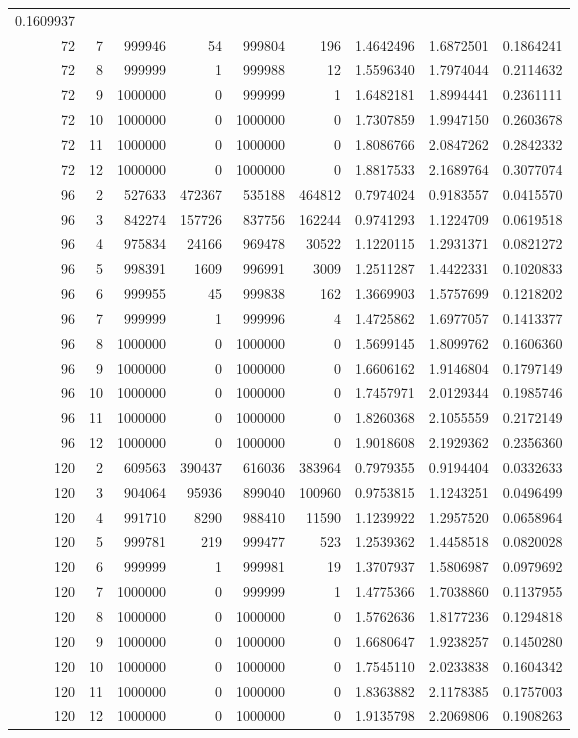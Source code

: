 \documentclass[]{article}
\begin{document}
\begin{longtable}[]{@{}rrrrrrrrr@{}}
0.1609937\tabularnewline
72 & 7 & 999946 & 54 & 999804 & 196 & 1.4642496 & 1.6872501 &
0.1864241\tabularnewline
72 & 8 & 999999 & 1 & 999988 & 12 & 1.5596340 & 1.7974044 &
0.2114632\tabularnewline
72 & 9 & 1000000 & 0 & 999999 & 1 & 1.6482181 & 1.8994441 &
0.2361111\tabularnewline
72 & 10 & 1000000 & 0 & 1000000 & 0 & 1.7307859 & 1.9947150 &
0.2603678\tabularnewline
72 & 11 & 1000000 & 0 & 1000000 & 0 & 1.8086766 & 2.0847262 &
0.2842332\tabularnewline
72 & 12 & 1000000 & 0 & 1000000 & 0 & 1.8817533 & 2.1689764 &
0.3077074\tabularnewline
96 & 2 & 527633 & 472367 & 535188 & 464812 & 0.7974024 & 0.9183557 &
0.0415570\tabularnewline
96 & 3 & 842274 & 157726 & 837756 & 162244 & 0.9741293 & 1.1224709 &
0.0619518\tabularnewline
96 & 4 & 975834 & 24166 & 969478 & 30522 & 1.1220115 & 1.2931371 &
0.0821272\tabularnewline
96 & 5 & 998391 & 1609 & 996991 & 3009 & 1.2511287 & 1.4422331 &
0.1020833\tabularnewline
96 & 6 & 999955 & 45 & 999838 & 162 & 1.3669903 & 1.5757699 &
0.1218202\tabularnewline
96 & 7 & 999999 & 1 & 999996 & 4 & 1.4725862 & 1.6977057 &
0.1413377\tabularnewline
96 & 8 & 1000000 & 0 & 1000000 & 0 & 1.5699145 & 1.8099762 &
0.1606360\tabularnewline
96 & 9 & 1000000 & 0 & 1000000 & 0 & 1.6606162 & 1.9146804 &
0.1797149\tabularnewline
96 & 10 & 1000000 & 0 & 1000000 & 0 & 1.7457971 & 2.0129344 &
0.1985746\tabularnewline
96 & 11 & 1000000 & 0 & 1000000 & 0 & 1.8260368 & 2.1055559 &
0.2172149\tabularnewline
96 & 12 & 1000000 & 0 & 1000000 & 0 & 1.9018608 & 2.1929362 &
0.2356360\tabularnewline
120 & 2 & 609563 & 390437 & 616036 & 383964 & 0.7979355 & 0.9194404 &
0.0332633\tabularnewline
120 & 3 & 904064 & 95936 & 899040 & 100960 & 0.9753815 & 1.1243251 &
0.0496499\tabularnewline
120 & 4 & 991710 & 8290 & 988410 & 11590 & 1.1239922 & 1.2957520 &
0.0658964\tabularnewline
120 & 5 & 999781 & 219 & 999477 & 523 & 1.2539362 & 1.4458518 &
0.0820028\tabularnewline
120 & 6 & 999999 & 1 & 999981 & 19 & 1.3707937 & 1.5806987 &
0.0979692\tabularnewline
120 & 7 & 1000000 & 0 & 999999 & 1 & 1.4775366 & 1.7038860 &
0.1137955\tabularnewline
120 & 8 & 1000000 & 0 & 1000000 & 0 & 1.5762636 & 1.8177236 &
0.1294818\tabularnewline
120 & 9 & 1000000 & 0 & 1000000 & 0 & 1.6680647 & 1.9238257 &
0.1450280\tabularnewline
120 & 10 & 1000000 & 0 & 1000000 & 0 & 1.7545110 & 2.0233838 &
0.1604342\tabularnewline
120 & 11 & 1000000 & 0 & 1000000 & 0 & 1.8363882 & 2.1178385 &
0.1757003\tabularnewline
120 & 12 & 1000000 & 0 & 1000000 & 0 & 1.9135798 & 2.2069806 &
0.1908263\tabularnewline
\bottomrule
\end{longtable}
\end{document}

